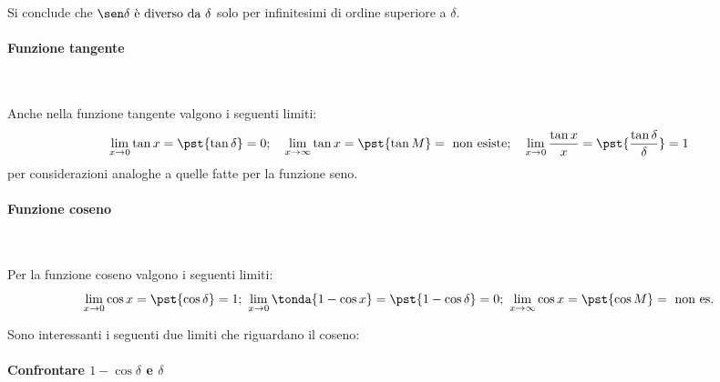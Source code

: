 Si conclude che \(\sen \delta \text{ è diverso da } \delta\) solo per 
infinitesimi di ordine superiore a \(\delta\).

\paragraph{Funzione tangente}~

Anche nella funzione tangente valgono i seguenti limiti:
\[\lim_{x \rightarrow 0}{\tan x} = \pst{\tan \delta} = 0; \quad
\lim_{x \rightarrow \infty}{\tan x} = \pst{\tan M} = 
                                      \text{ non esiste}; \quad
\lim_{x \rightarrow 0}\frac{\tan x}{x} = \pst{\frac{\tan \delta}{\delta}} 
                                       = 1\]
per considerazioni analoghe a quelle fatte per la funzione seno.

\paragraph{Funzione coseno}~

Per la funzione coseno valgono i seguenti limiti:
\[\lim_{x \rightarrow 0}{\cos x} = \pst{\cos \delta} = 1; ~
\lim_{x \rightarrow 0}\tonda{1-\cos x} = \pst{1-\cos \delta} = 0; ~
\lim_{x \rightarrow \infty}{\cos x} = \pst{\cos M} = \text{ non es.}\]

Sono interessanti i seguenti due limiti che riguardano il coseno:
\paragraph{Confrontare \(1-\cos\delta\) e \(\delta\)}~
\label{senoverso1}

